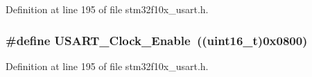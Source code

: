 Definition at line 195 of file stm32f10x\+\_\+usart.\+h.

\subsubsection[{\texorpdfstring{U\+S\+A\+R\+T\+\_\+\+Clock\+\_\+\+Enable}{USART_Clock_Enable}}]{\setlength{\rightskip}{0pt plus 5cm}\#define U\+S\+A\+R\+T\+\_\+\+Clock\+\_\+\+Enable~(({\bf uint16\+\_\+t})0x0800)}\hypertarget{group___u_s_a_r_t___clock_gacfe029e2ec4f49ddde031fd031654caa}{}\label{group___u_s_a_r_t___clock_gacfe029e2ec4f49ddde031fd031654caa}


Definition at line 195 of file stm32f10x\+\_\+usart.\+h.

